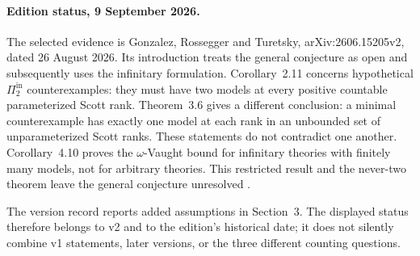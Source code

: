 \paragraph{Edition status, 9 September 2026.}
The selected evidence is Gonzalez, Rossegger and Turetsky,
arXiv:2606.15205v2, dated 26 August 2026. Its introduction treats the general
conjecture as open and subsequently uses the infinitary formulation.
Corollary~2.11 concerns hypothetical \(\Pi^{\mathrm{in}}_2\)
counterexamples: they must have two models at every positive countable
parameterized Scott rank. Theorem~3.6 gives a different conclusion: a minimal
counterexample has exactly one model at each rank in an unbounded set of
unparameterized Scott ranks. These statements do not contradict one another.
Corollary~4.10 proves the \(\omega\)-Vaught bound for infinitary theories
with finitely many models, not for arbitrary theories. This restricted
result and the never-two theorem leave the general conjecture unresolved
\cite{GonzalezRosseggerTuretsky2026Status}.

The version record reports added assumptions in Section~3. The displayed
status therefore belongs to v2 and to the edition's historical date; it does
not silently combine v1 statements, later versions, or the three different
counting questions.
